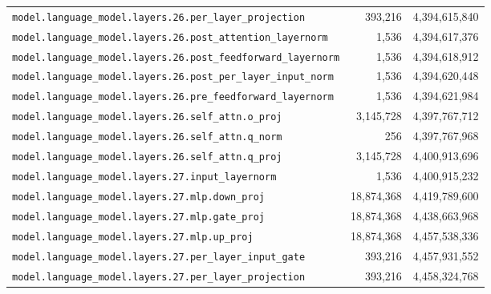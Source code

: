 \documentclass[10pt,a4paper]{article}
\theoremstyle{definition}
\begin{document}
\begin{appendices}
\begin{longtable}{p{9.5cm}rr}
\texttt{model.\allowbreak{}language\_model.\allowbreak{}layers.\allowbreak{}26.\allowbreak{}per\_layer\_projection} & 393,216 & 4,394,615,840 \\
\texttt{model.\allowbreak{}language\_model.\allowbreak{}layers.\allowbreak{}26.\allowbreak{}post\_attention\_layernorm} & 1,536 & 4,394,617,376 \\
\texttt{model.\allowbreak{}language\_model.\allowbreak{}layers.\allowbreak{}26.\allowbreak{}post\_feedforward\_layernorm} & 1,536 & 4,394,618,912 \\
\texttt{model.\allowbreak{}language\_model.\allowbreak{}layers.\allowbreak{}26.\allowbreak{}post\_per\_layer\_input\_norm} & 1,536 & 4,394,620,448 \\
\texttt{model.\allowbreak{}language\_model.\allowbreak{}layers.\allowbreak{}26.\allowbreak{}pre\_feedforward\_layernorm} & 1,536 & 4,394,621,984 \\
\texttt{model.\allowbreak{}language\_model.\allowbreak{}layers.\allowbreak{}26.\allowbreak{}self\_attn.\allowbreak{}o\_proj} & 3,145,728 & 4,397,767,712 \\
\texttt{model.\allowbreak{}language\_model.\allowbreak{}layers.\allowbreak{}26.\allowbreak{}self\_attn.\allowbreak{}q\_norm} & 256 & 4,397,767,968 \\
\texttt{model.\allowbreak{}language\_model.\allowbreak{}layers.\allowbreak{}26.\allowbreak{}self\_attn.\allowbreak{}q\_proj} & 3,145,728 & 4,400,913,696 \\
\texttt{model.\allowbreak{}language\_model.\allowbreak{}layers.\allowbreak{}27.\allowbreak{}input\_layernorm} & 1,536 & 4,400,915,232 \\
\texttt{model.\allowbreak{}language\_model.\allowbreak{}layers.\allowbreak{}27.\allowbreak{}mlp.\allowbreak{}down\_proj} & 18,874,368 & 4,419,789,600 \\
\texttt{model.\allowbreak{}language\_model.\allowbreak{}layers.\allowbreak{}27.\allowbreak{}mlp.\allowbreak{}gate\_proj} & 18,874,368 & 4,438,663,968 \\
\texttt{model.\allowbreak{}language\_model.\allowbreak{}layers.\allowbreak{}27.\allowbreak{}mlp.\allowbreak{}up\_proj} & 18,874,368 & 4,457,538,336 \\
\texttt{model.\allowbreak{}language\_model.\allowbreak{}layers.\allowbreak{}27.\allowbreak{}per\_layer\_input\_gate} & 393,216 & 4,457,931,552 \\
\texttt{model.\allowbreak{}language\_model.\allowbreak{}layers.\allowbreak{}27.\allowbreak{}per\_layer\_projection} & 393,216 & 4,458,324,768 \\

\end{longtable}
\end{appendices}
\end{document}
